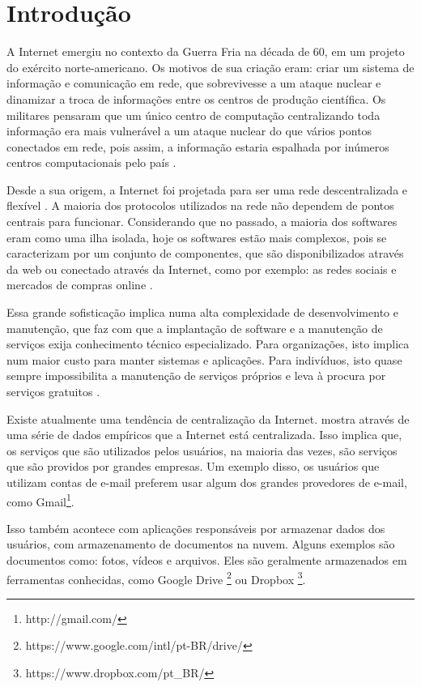 \chapter{Introdução}
\label{cap-introducao}

A Internet emergiu no contexto da Guerra Fria na década
de 60, em um projeto do exército norte-americano. Os motivos de sua criação eram:
criar um sistema de informação e comunicação em rede, que
sobrevivesse a um ataque nuclear e dinamizar a troca de informações entre os centros de
produção científica. Os militares pensaram que um único centro de computação
centralizando toda informação era mais vulnerável a um ataque nuclear do que vários
pontos conectados em rede, pois assim, a informação estaria espalhada por inúmeros
centros computacionais pelo país \cite{giles2010psychology}.

Desde a sua origem, a Internet foi projetada para ser uma rede
descentralizada e flexível \cite{galaxia}. A maioria dos protocolos
utilizados na rede não dependem de pontos centrais para funcionar. 
Considerando que no
passado, a maioria dos softwares eram como uma ilha isolada, hoje os softwares 
estão mais complexos, pois se caracterizam por um conjunto de componentes, que 
são disponibilizados através da web ou conectado através da Internet,
como por exemplo: as redes sociais e mercados de compras online \cite{byhand}.

Essa grande sofisticação implica numa alta complexidade de
desenvolvimento e manutenção, que faz com que a
implantação de software e a manutenção de serviços exija conhecimento técnico
especializado. Para organizações, isto implica num maior
custo para manter sistemas e aplicações. Para indivíduos, isto quase sempre
impossibilita a manutenção de serviços próprios e leva à procura por serviços
gratuitos \cite{shak2015}.

Existe atualmente uma tendência de centralização da Internet. 
mostra
através de uma série de dados empíricos que a Internet está centralizada. Isso
implica que, os serviços que são utilizados pelos usuários, na maioria
das vezes, são serviços que são providos por grandes empresas. 
Um exemplo disso, os usuários que utilizam contas de e-mail preferem usar algum
dos grandes provedores de e-mail, como Gmail\footnote{http://gmail.com/}. 

Isso também acontece com aplicações responsáveis por armazenar dados dos usuários,
com armazenamento de documentos na nuvem. Alguns exemplos são 
documentos como: fotos, vídeos e arquivos. Eles são geralmente armazenados em 
ferramentas conhecidas, como Google Drive 
\footnote{https://www.google.com/intl/pt-BR/drive/} ou Dropbox \footnote{https://www.dropbox.com/pt\_BR/}. 

